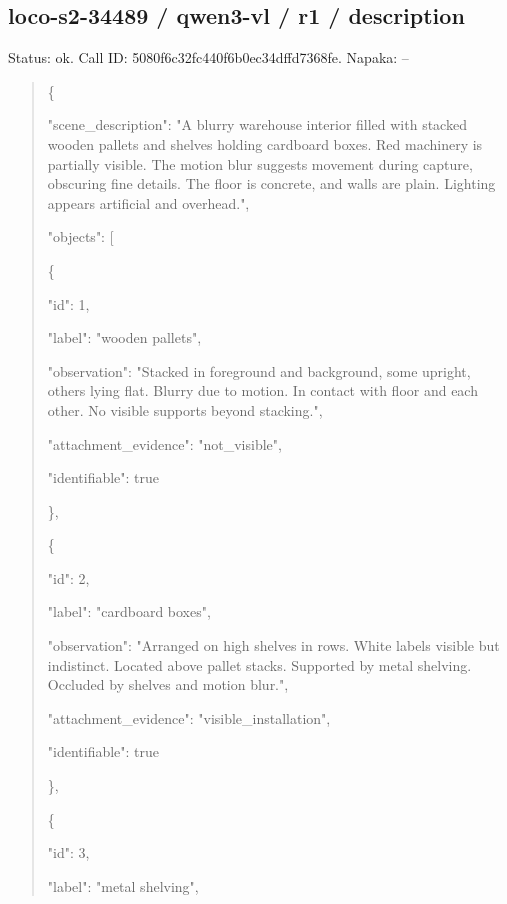 \documentclass[10pt,a4paper]{article}
\begin{document}
\subsection*{loco-s2-34489 / qwen3-vl / r1 / description}
Status: ok. Call ID: 5080f6c32fc440f6b0ec34dffd7368fe. Napaka: --
\begin{quote}\footnotesize
\{\par
  "scene\_description":\allowbreak{} "A blurry warehouse interior filled with stacked wooden pallets and shelves holding cardboard boxes. Red machinery is partially visible. The motion blur suggests movement during capture,\allowbreak{} obscuring fine details. The floor is concrete,\allowbreak{} and walls are plain. Lighting appears artificial and overhead.",\allowbreak{}\par
  "objects":\allowbreak{} [\par
    \{\par
      "id":\allowbreak{} 1,\allowbreak{}\par
      "label":\allowbreak{} "wooden pallets",\allowbreak{}\par
      "observation":\allowbreak{} "Stacked in foreground and background,\allowbreak{} some upright,\allowbreak{} others lying flat. Blurry due to motion. In contact with floor and each other. No visible supports beyond stacking.",\allowbreak{}\par
      "attachment\_evidence":\allowbreak{} "not\_visible",\allowbreak{}\par
      "identifiable":\allowbreak{} true\par
    \},\allowbreak{}\par
    \{\par
      "id":\allowbreak{} 2,\allowbreak{}\par
      "label":\allowbreak{} "cardboard boxes",\allowbreak{}\par
      "observation":\allowbreak{} "Arranged on high shelves in rows. White labels visible but indistinct. Located above pallet stacks. Supported by metal shelving. Occluded by shelves and motion blur.",\allowbreak{}\par
      "attachment\_evidence":\allowbreak{} "visible\_installation",\allowbreak{}\par
      "identifiable":\allowbreak{} true\par
    \},\allowbreak{}\par
    \{\par
      "id":\allowbreak{} 3,\allowbreak{}\par
      "label":\allowbreak{} "metal shelving",\allowbreak{}\par

\end{quote}
\end{document}

